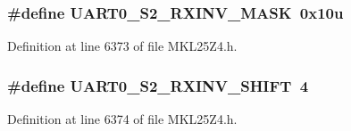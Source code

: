 \subsubsection[{\texorpdfstring{U\+A\+R\+T0\+\_\+\+S2\+\_\+\+R\+X\+I\+N\+V\+\_\+\+M\+A\+SK}{UART0_S2_RXINV_MASK}}]{\setlength{\rightskip}{0pt plus 5cm}\#define U\+A\+R\+T0\+\_\+\+S2\+\_\+\+R\+X\+I\+N\+V\+\_\+\+M\+A\+SK~0x10u}\hypertarget{group___u_a_r_t0___register___masks_ga81c81000cf5906711578a36178776ae9}{}\label{group___u_a_r_t0___register___masks_ga81c81000cf5906711578a36178776ae9}


Definition at line 6373 of file M\+K\+L25\+Z4.\+h.

\subsubsection[{\texorpdfstring{U\+A\+R\+T0\+\_\+\+S2\+\_\+\+R\+X\+I\+N\+V\+\_\+\+S\+H\+I\+FT}{UART0_S2_RXINV_SHIFT}}]{\setlength{\rightskip}{0pt plus 5cm}\#define U\+A\+R\+T0\+\_\+\+S2\+\_\+\+R\+X\+I\+N\+V\+\_\+\+S\+H\+I\+FT~4}\hypertarget{group___u_a_r_t0___register___masks_ga7c2ed6447fb3c4daa5ed8fd4b29cffca}{}\label{group___u_a_r_t0___register___masks_ga7c2ed6447fb3c4daa5ed8fd4b29cffca}


Definition at line 6374 of file M\+K\+L25\+Z4.\+h.

